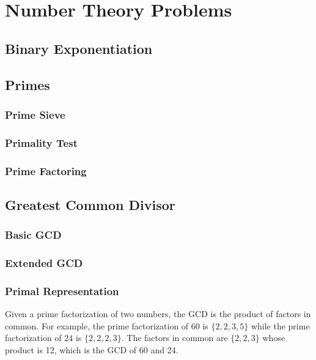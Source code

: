 \section{Number Theory Problems}

\subsection{Binary Exponentiation}

\subsection{Primes}

\subsubsection{Prime Sieve}

\subsubsection{Primality Test}

\subsubsection{Prime Factoring}

\subsection{Greatest Common Divisor}

\subsubsection{Basic GCD}

\subsubsection{Extended GCD}

\subsubsection{Primal Representation}

Given a prime factorization of two numbers, the GCD is the product of factors in common. For example, the prime factorization of $60$ is $\{2,2,3,5\}$ while the prime factorization of $24$ is $\{2,2,2,3\}$. The factors in common are $\{2,2,3\}$ whose product is 12, which is the GCD of 60 and 24.

